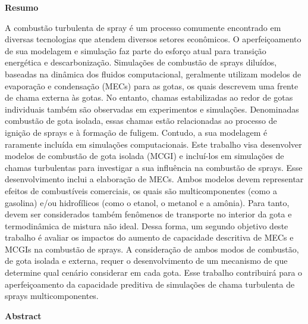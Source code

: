 
\vspace{2cm}

{ \Large \textbf{Resumo}}

\vspace{0.8cm}

{

\noindent %
A combustão turbulenta de spray é um processo comumente encontrado em diversas tecnologias que atendem diversos setores econômicos. 
O aperfeiçoamento de sua modelagem e simulação faz parte do esforço atual para transição energética e descarbonização.
Simulações de combustão de sprays diluídos, baseadas na dinâmica dos fluidos computacional, geralmente utilizam modelos de evaporação e condensação (MECs) para as gotas, os quais descrevem uma frente de chama externa às gotas.
No entanto, chamas estabilizadas ao redor de gotas individuais também são observadas em experimentos e simulações.
Denominadas combustão de gota isolada, essas chamas estão relacionadas ao processo de ignição de sprays e à formação de fuligem.
Contudo, a sua modelagem é raramente incluída em simulações computacionais.
Este trabalho visa desenvolver modelos de combustão de gota isolada (MCGI) e incluí-los em simulações de chamas turbulentas para investigar a sua influência na combustão de sprays.
Esse desenvolvimento inclui a elaboração de MECs.
Ambos modelos devem representar efeitos de combustíveis comerciais, os quais são multicomponentes (como a gasolina) e/ou hidrofílicos (como o etanol, o metanol e a amônia). 
Para tanto, devem ser considerados também fenômenos de transporte no interior da gota e termodinâmica de mistura não ideal.
Dessa forma, um segundo objetivo deste trabalho é avaliar os impactos do aumento de capacidade descritiva de MECs e MCGIs na combustão de sprays.
A consideração de ambos modos de combustão, de gota isolada e externa, requer o desenvolvimento de um mecanismo de que determine qual cenário considerar em cada gota.
Esse trabalho contribuirá para o aperfeiçoamento da capacidade preditiva de simulações de chama turbulenta de sprays multicomponentes.

}

\vfil

{ \Large \textbf{Abstract}}

\vspace{0.8cm}

